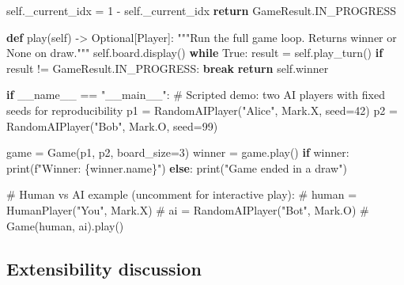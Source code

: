\documentclass[11pt]{article}
\newenvironment{Shaded}{\begin{snugshade}}{\end{snugshade}}
\newcommand{\BuiltInTok}[1]{\textcolor[rgb]{0.50,0.55,0.55}{#1}}
\newcommand{\CommentTok}[1]{\textcolor[rgb]{0.48,0.49,0.49}{#1}}
\newcommand{\ControlFlowTok}[1]{\textcolor[rgb]{0.99,0.74,0.29}{\textbf{#1}}}
\newcommand{\DecValTok}[1]{\textcolor[rgb]{0.96,0.45,0.00}{#1}}
\newcommand{\KeywordTok}[1]{\textcolor[rgb]{0.81,0.81,0.76}{\textbf{#1}}}
\newcommand{\NormalTok}[1]{\textcolor[rgb]{0.81,0.81,0.76}{#1}}
\newcommand{\OperatorTok}[1]{\textcolor[rgb]{0.81,0.81,0.76}{#1}}
\newcommand{\SpecialCharTok}[1]{\textcolor[rgb]{0.24,0.68,0.91}{#1}}
\newcommand{\SpecialStringTok}[1]{\textcolor[rgb]{0.85,0.27,0.33}{#1}}
\newcommand{\StringTok}[1]{\textcolor[rgb]{0.96,0.31,0.31}{#1}}
\newcommand{\VariableTok}[1]{\textcolor[rgb]{0.15,0.68,0.68}{#1}}
\begin{document}
\begin{Shaded}
\begin{Highlighting}[]
        \VariableTok{self}\NormalTok{.\_current\_idx }\OperatorTok{=} \DecValTok{1} \OperatorTok{{-}} \VariableTok{self}\NormalTok{.\_current\_idx}
        \ControlFlowTok{return}\NormalTok{ GameResult.IN\_PROGRESS}

    \KeywordTok{def}\NormalTok{ play(}\VariableTok{self}\NormalTok{) }\OperatorTok{{-}\textgreater{}}\NormalTok{ Optional[Player]:}
        \CommentTok{"""Run the full game loop. Returns winner or None on draw."""}
        \VariableTok{self}\NormalTok{.board.display()}
        \ControlFlowTok{while} \VariableTok{True}\NormalTok{:}
\NormalTok{            result }\OperatorTok{=} \VariableTok{self}\NormalTok{.play\_turn()}
            \ControlFlowTok{if}\NormalTok{ result }\OperatorTok{!=}\NormalTok{ GameResult.IN\_PROGRESS:}
                \ControlFlowTok{break}
        \ControlFlowTok{return} \VariableTok{self}\NormalTok{.winner}


\ControlFlowTok{if} \VariableTok{\_\_name\_\_} \OperatorTok{==} \StringTok{"\_\_main\_\_"}\NormalTok{:}
    \CommentTok{\# Scripted demo: two AI players with fixed seeds for reproducibility}
\NormalTok{    p1 }\OperatorTok{=}\NormalTok{ RandomAIPlayer(}\StringTok{"Alice"}\NormalTok{, Mark.X, seed}\OperatorTok{=}\DecValTok{42}\NormalTok{)}
\NormalTok{    p2 }\OperatorTok{=}\NormalTok{ RandomAIPlayer(}\StringTok{"Bob"}\NormalTok{, Mark.O, seed}\OperatorTok{=}\DecValTok{99}\NormalTok{)}

\NormalTok{    game }\OperatorTok{=}\NormalTok{ Game(p1, p2, board\_size}\OperatorTok{=}\DecValTok{3}\NormalTok{)}
\NormalTok{    winner }\OperatorTok{=}\NormalTok{ game.play()}
    \ControlFlowTok{if}\NormalTok{ winner:}
        \BuiltInTok{print}\NormalTok{(}\SpecialStringTok{f"Winner: }\SpecialCharTok{\{}\NormalTok{winner}\SpecialCharTok{.}\NormalTok{name}\SpecialCharTok{\}}\SpecialStringTok{"}\NormalTok{)}
    \ControlFlowTok{else}\NormalTok{:}
        \BuiltInTok{print}\NormalTok{(}\StringTok{"Game ended in a draw"}\NormalTok{)}

    \CommentTok{\# Human vs AI example (uncomment for interactive play):}
    \CommentTok{\# human = HumanPlayer("You", Mark.X)}
    \CommentTok{\# ai = RandomAIPlayer("Bot", Mark.O)}
    \CommentTok{\# Game(human, ai).play()}
\end{Highlighting}
\end{Shaded}

\subsection{Extensibility discussion}\label{extensibility-discussion-5}
\end{document}
